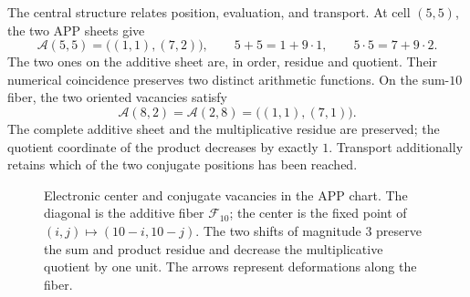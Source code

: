 The central structure relates position, evaluation, and transport. At
cell \((5,5)\), the two APP sheets give
\begin{equation}
 \mathcal A(5,5)=\bigl((1,1),(7,2)\bigr),\qquad
 5+5=1+9\cdot1,\qquad5\cdot5=7+9\cdot2.
 \label{x_reciprocidad:el-centro:app}
\end{equation}
The two ones on the additive sheet are, in order, residue and quotient.
Their numerical coincidence preserves two distinct arithmetic functions.
On the sum-\(10\) fiber, the two oriented vacancies satisfy
\begin{equation}
 \mathcal A(8,2)=\mathcal A(2,8)=\bigl((1,1),(7,1)\bigr).
 \label{x_reciprocidad:el-centro:vacancias}
\end{equation}
The complete additive sheet and the multiplicative residue are preserved;
the quotient coordinate of the product decreases by exactly
\(1\). Transport additionally retains which of the two conjugate
positions has been reached.


\begin{figure}[H]
\centering
{}
\caption{Electronic center and conjugate vacancies in the APP chart.
The diagonal is the additive fiber \(\mathcal F_{10}\); the center
is the fixed point of \((i,j)\mapsto(10-i,10-j)\). The two
shifts of magnitude \(3\) preserve the sum and product
residue and decrease the multiplicative quotient by one unit. The
arrows represent deformations along the fiber.}
\label{x_reciprocidad:el-centro:figura}
\end{figure}

